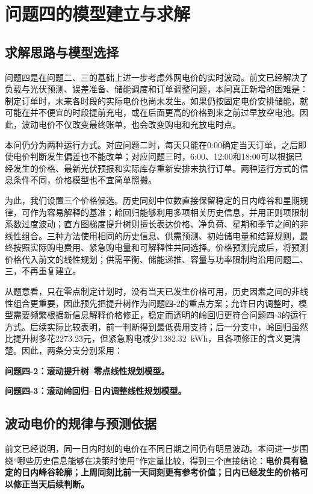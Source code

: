 \section{问题四的模型建立与求解}

\subsection{求解思路与模型选择}

问题四是在问题二、三的基础上进一步考虑外网电价的实时波动。前文已经解决了负载与光伏预测、误差准备、储能调度和订单调整问题，本问真正新增的困难是：制定订单时，未来各时段的实际电价也尚未发生。如果仍按固定电价安排储能，就可能在并不便宜的时段提前充电，或在后面更高的价格到来之前过早放空电池。因此，波动电价不仅改变最终账单，也会改变购电和充放电时点。

本问仍分为两种运行方式。对应问题二时，每天只能在0:00确定当天订单，之后即使电价判断发生偏差也不能改单；对应问题三时，6:00、12:00和18:00可以根据已经发生的价格、最新光伏预报和实际库存重新安排未执行订单。两种运行方式的信息条件不同，价格模型也不宜简单照搬。

为此，我们设置三个价格候选。历史同刻中位数直接保留稳定的日内峰谷和星期规律，可作为容易解释的基准；岭回归能够利用多项相关历史信息，并用正则项限制系数过度波动；直方图梯度提升树则擅长表达价格、净负荷、星期和季节之间的非线性组合。三种方法使用相同的历史信息、供需预测、初始储电量和结算规则，最终按照实际购电费用、紧急购电量和可解释性共同选择。价格预测完成后，将预测价格代入前文的线性规划；供需平衡、储能递推、容量与功率限制均沿用问题二、三，不再重复建立。

从题意看，只在零点制定计划时，没有当天已发生价格可用，历史因素之间的非线性组合更重要，因此预先把提升树作为问题四-2的重点方案；允许日内调整时，模型需要频繁根据新信息解释价格修正，稳定而透明的岭回归更符合问题四-3的运行方式。后续实际比较表明，前一判断得到最低费用支持；后一分支中，岭回归虽然比提升树多花2273.23元，但紧急购电减少1382.32~kWh，且各项修正的含义更清楚。因此，两条分支分别采用：

\textbf{问题四-2：滚动提升树--零点线性规划模型。}

\textbf{问题四-3：滚动岭回归--日内调整线性规划模型。}

\subsection{波动电价的规律与预测依据}

前文已经说明，同一日内时刻的电价在不同日期之间仍有明显波动。本问进一步围绕“哪些历史信息能够在决策时使用”作定量比较，得到三个直接结论：\textbf{电价具有稳定的日内峰谷轮廓；上周同刻比前一天同刻更有参考价值；日内已经发生的价格可以修正当天后续判断。}

